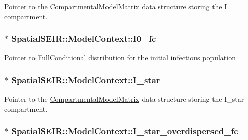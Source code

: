 Pointer to the \hyperlink{classSpatialSEIR_1_1CompartmentalModelMatrix}{Compartmental\-Model\-Matrix} data structure storing the I compartment. \hypertarget{classSpatialSEIR_1_1ModelContext_a595c21a8b6130f09e3a2af6e114fe9da}{
\subsubsection[{I0\-\_\-fc}]{$\ast$ Spatial\-S\-E\-I\-R\-::\-Model\-Context\-::\-I0\-\_\-fc}}\label{classSpatialSEIR_1_1ModelContext_a595c21a8b6130f09e3a2af6e114fe9da}
Pointer to \hyperlink{classSpatialSEIR_1_1FullConditional}{Full\-Conditional} distribution for the initial infectious population \hypertarget{classSpatialSEIR_1_1ModelContext_adf47583e6bd65b272ea17dc84620e09f}{
\subsubsection[{I\-\_\-star}]{$\ast$ Spatial\-S\-E\-I\-R\-::\-Model\-Context\-::\-I\-\_\-star}}\label{classSpatialSEIR_1_1ModelContext_adf47583e6bd65b272ea17dc84620e09f}
Pointer to the \hyperlink{classSpatialSEIR_1_1CompartmentalModelMatrix}{Compartmental\-Model\-Matrix} data structure storing the I\-\_\-star compartment. \hypertarget{classSpatialSEIR_1_1ModelContext_a7c02046540bcf230845d6d6821148d67}{
\subsubsection[{I\-\_\-star\-\_\-overdispersed\-\_\-fc}]{$\ast$ Spatial\-S\-E\-I\-R\-::\-Model\-Context\-::\-I\-\_\-star\-\_\-overdispersed\-\_\-fc}}\label{classSpatialSEIR_1_1ModelContext_a7c02046540bcf230845d6d6821148d67}

